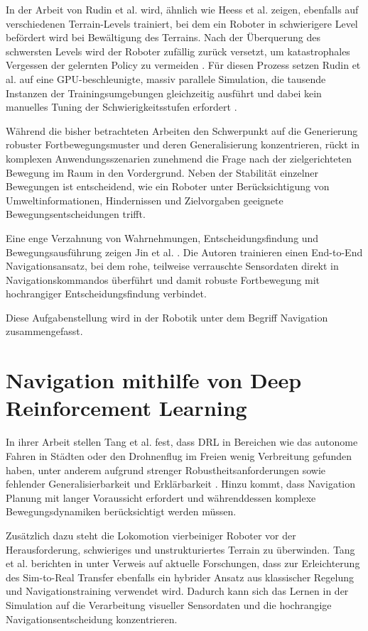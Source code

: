 In der Arbeit von Rudin et al. \cite{rudin2022learningwalkminutesusing} wird, ähnlich wie Heess et al. \cite{heessEmergenceLocomotionBehaviours2017} zeigen, ebenfalls auf verschiedenen Terrain-Levels trainiert, bei dem ein Roboter in schwierigere Level befördert wird bei Bewältigung des Terrains. Nach der Überquerung des schwersten Levels wird der Roboter zufällig zurück versetzt, um katastrophales Vergessen der gelernten Policy zu vermeiden \cite{rudin2022learningwalkminutesusing}. Für diesen Prozess setzen Rudin et al. auf eine GPU-beschleunigte, massiv parallele Simulation, die tausende Instanzen der Trainingsumgebungen gleichzeitig ausführt und dabei kein manuelles Tuning der Schwierigkeitsstufen erfordert \cite{rudin2022learningwalkminutesusing}.

Während die bisher betrachteten Arbeiten den Schwerpunkt auf die Generierung robuster Fortbewegungsmuster und deren Generalisierung konzentrieren, rückt in komplexen Anwendungsszenarien zunehmend die Frage nach der zielgerichteten Bewegung im Raum in den Vordergrund. Neben der Stabilität einzelner Bewegungen ist entscheidend, wie ein Roboter unter Berücksichtigung von Umweltinformationen, Hindernissen und Zielvorgaben geeignete Bewegungsentscheidungen trifft.

Eine enge Verzahnung von Wahrnehmungen, Entscheidungsfindung und Bewegungsausführung zeigen Jin et al. \cite{jinResilientLeggedLocal2023}. Die Autoren trainieren einen End-to-End Navigationsansatz, bei dem rohe, teilweise verrauschte Sensordaten direkt in Navigationskommandos überführt und damit robuste Fortbewegung mit hochrangiger Entscheidungsfindung verbindet.

Diese Aufgabenstellung wird in der Robotik unter dem Begriff Navigation zusammengefasst.

\section{Navigation mithilfe von Deep Reinforcement Learning}
In ihrer Arbeit stellen Tang et al. fest, dass DRL in Bereichen wie das autonome Fahren in Städten oder den Drohnenflug im Freien wenig Verbreitung gefunden haben, unter anderem aufgrund strenger Robustheitsanforderungen sowie fehlender Generalisierbarkeit und Erklärbarkeit \cite{tangDeepReinforcementLearning2024}. Hinzu kommt, dass Navigation Planung mit langer Voraussicht erfordert und währenddessen komplexe Bewegungsdynamiken berücksichtigt werden müssen.

Zusätzlich dazu steht die Lokomotion vierbeiniger Roboter vor der Herausforderung, schwieriges und unstrukturiertes Terrain zu überwinden. Tang et al. berichten in \cite{tangDeepReinforcementLearning2024} unter Verweis auf aktuelle Forschungen, dass zur Erleichterung des Sim-to-Real Transfer ebenfalls ein hybrider Ansatz aus klassischer Regelung und Navigationstraining verwendet wird. Dadurch kann sich das Lernen in der Simulation auf die Verarbeitung visueller Sensordaten und die hochrangige Navigationsentscheidung konzentrieren.

